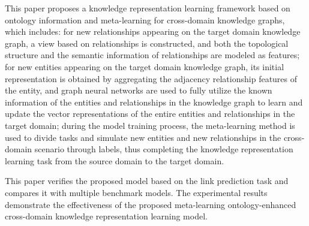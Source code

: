This paper proposes a knowledge representation learning framework based on ontology information and meta-learning for cross-domain knowledge graphs, which includes: for new relationships appearing on the target domain knowledge graph, a view based on relationships is constructed, and both the topological structure and the semantic information of relationships are modeled as features; for new entities appearing on the target domain knowledge graph, its initial representation is obtained by aggregating the adjacency relationship features of the entity, and graph neural networks are used to fully utilize the known information of the entities and relationships in the knowledge graph to learn and update the vector representations of the entire entities and relationships in the target domain; during the model training process, the meta-learning method is used to divide tasks and simulate new entities and new relationships in the cross-domain scenario through labels, thus completing the knowledge representation learning task from the source domain to the target domain.

This paper verifies the proposed model based on the link prediction task and compares it with multiple benchmark models. The experimental results demonstrate the effectiveness of the proposed meta-learning ontology-enhanced cross-domain knowledge representation learning model.